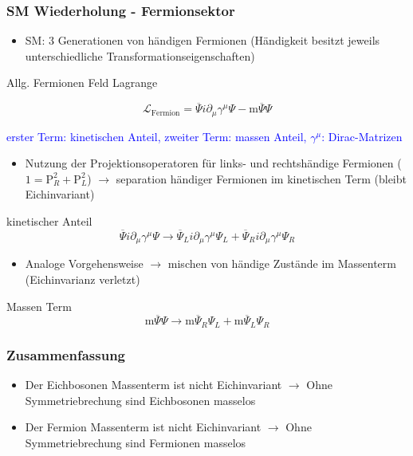 \documentclass[xcolor=dvipsnames]{beamer}
\begin{document}
\begin{frame}
\frametitle{SM Wiederholung - Fermionsektor}
\begin{itemize}
\item SM: 3 Generationen von händigen Fermionen (Händigkeit besitzt jeweils unterschiedliche Transformationseigenschaften)
\end{itemize}
\begin{block}{Allg. Fermionen Feld Lagrange}

\begin{equation*}
\mathscr{L}_{\text{Fermion}}=\overline{\Psi} i \partial_{\mu} \gamma^{\mu} \Psi -\text{m}\overline{\Psi} \Psi 
\end{equation*}
\end{block}
\textcolor{Blue}{erster Term: kinetischen Anteil, zweiter Term: massen Anteil,  $\gamma^{\mu}$: Dirac-Matrizen}
\end{frame}
\begin{frame}
\begin{itemize}
\item Nutzung der Projektionsoperatoren für links- und rechtshändige Fermionen ($1=\text{P}_{R}^{2}+ \text{P}_{L}^{2}$) $\rightarrow $ separation händiger Fermionen im kinetischen Term (bleibt Eichinvariant)

\end{itemize}
\begin{block}{kinetischer Anteil}
\begin{equation*}
\overline{\Psi} i \partial_{\mu} \gamma^{\mu} \Psi  \rightarrow \overline{\Psi}_{L} i \partial_{\mu} \gamma^{\mu} \Psi_{L} +\overline{\Psi}_{R} i \partial_{\mu} \gamma^{\mu} \Psi_{R} 
\end{equation*}
\end{block}

\begin{itemize}
\item Analoge Vorgehensweise $\rightarrow$ mischen von  händige Zustände im Massenterm  (Eichinvarianz verletzt)
\end{itemize}

\begin{block}{Massen Term}
\begin{equation*}
\text{m}\overline{\Psi} \Psi  \rightarrow \text{m}\overline{\Psi}_{R} \Psi_{L} +\text{m}\overline{\Psi}_{L} \Psi_{R} 
\end{equation*}
\end{block}
\end{frame}
\begin{frame}
\frametitle{Zusammenfassung}
\begin{itemize}
\item Der Eichbosonen Massenterm ist nicht Eichinvariant   $\rightarrow$ Ohne Symmetriebrechung sind Eichbosonen masselos
\item Der Fermion Massenterm ist nicht Eichinvariant  $\rightarrow$ Ohne Symmetriebrechung sind Fermionen masselos
\end{itemize}
\end{frame}
\end{document}
